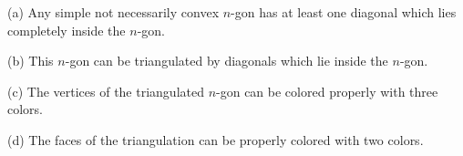 (a) Any simple not necessarily convex $n$-gon has at least one diagonal which lies completely inside the $n$-gon.

(b) This $n$-gon can be triangulated by diagonals which lie inside the $n$-gon.

(c) The vertices of the triangulated $n$-gon can be colored properly with three colors.

(d) The faces of the triangulation can be properly colored with two colors.
